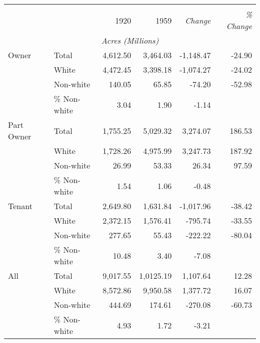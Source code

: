 \begin{tabular}{llrrrr}
\hline
        &           &     &     &   \\
 &  &    1920 &     1959 & \textit{Change} &  \textit{\% Change} \\
[.5em]
\hline 

\multicolumn{6}{c}{\textit{Acres (Millions)}} \\
[.5em]
Owner & Total & 4,612.50 & 3,464.03 & -1,148.47 & -24.90 \\
 & White & 4,472.45 & 3,398.18 & -1,074.27 & -24.02 \\
 & Non-white & 140.05 & 65.85 & -74.20 & -52.98 \\
 & \% Non-white & 3.04 & 1.90 & -1.14 &  \\
 [1em]
Part Owner & Total & 1,755.25 & 5,029.32 & 3,274.07 & 186.53 \\
 & White & 1,728.26 & 4,975.99 & 3,247.73 & 187.92 \\
 & Non-white & 26.99 & 53.33 & 26.34 & 97.59 \\
 & \% Non-white & 1.54 & 1.06 & -0.48 & \\
 [1em]
Tenant & Total & 2,649.80 & 1,631.84 & -1,017.96 & -38.42 \\
 & White & 2,372.15 & 1,576.41 & -795.74 & -33.55 \\
 & Non-white & 277.65 & 55.43 & -222.22 & -80.04 \\
 & \% Non-white & 10.48 & 3.40 & -7.08 &  \\
 [1em]
All & Total & 9,017.55 & 1,0125.19 & 1,107.64 & 12.28 \\
 & White & 8,572.86 & 9,950.58 & 1,377.72 & 16.07 \\
 & Non-white & 444.69 & 174.61 & -270.08 & -60.73 \\
 & \% Non-white & 4.93 & 1.72 & -3.21 &  \\
 [.5em]
\hline 



\end{tabular}
